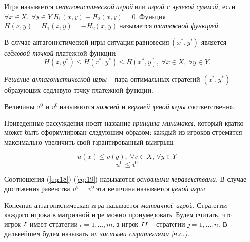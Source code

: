 \begin{definition}
	Игра называется \emph{антагонистической игрой} или \emph{игрой с нулевой суммой}, если $\forall x \in X, \ \forall y \in Y \ H_1(x,y)+H_2(x,y) = 0$. Функция $H(x,y) = H_1(x,y) = -H_2(x,y)$ называется \emph{платежной функцией}.
\end{definition}

\begin{definition}
	В случае антагонистической игры ситуация равновесия $(x^*,y^*)$ является \emph{седловой точкой} платежной функции:
	\[
		H(x,y^*) \leqslant H(x^*,y^*) \leqslant H(x^*,y), \ \forall x \in X, \ \forall y \in Y.
	\]
\end{definition}

\begin{definition}
	\emph{Решение антагонистической игры} -- пара оптимальных стратегий $(x^*,y^*)$, образующих седловую точку платежной функции.
\end{definition}

\begin{definition}
	Величины $u^0$ и $v^0$ называются \emph{нижней} и \emph{верхней ценой игры} соответственно.
\end{definition}

\begin{definition}
	Приведенные рассуждения носят название \emph{принципа минимакса}, который кратко может быть сформулирован следующим образом: каждый из игроков стремится максимально увеличить свой гарантированный выигрыш.
\end{definition}

\begin{equation}\label{eq:18}
	u(x) \leqslant v(y), \ \forall x \in X, \ \forall y \in Y
\end{equation}
\begin{equation}\label{eq:19}
	u^0 \leqslant v^0
\end{equation}

\begin{definition}
	Соотношения (\ref{eq:18})-(\ref{eq:19}) называются \emph{основными неравенствами}. В случае достижения равенства $u^0 = v^0$ эта величина называется \emph{ценой игры}.
\end{definition}

\begin{definition}
	Конечная антагонистическая игра называется \emph{матричной игрой}. Стратегии каждого игрока в матричной игре можно пронумеровать. Будем считать, что игрок $\RomanNumeralCaps{1}$ имеет стратегии $i = 1,\ldots ,m$, а игрок $\RomanNumeralCaps{2}$ -- стратегии $j=1,\ldots ,n$. В дальнейшем будем называть их \emph{чистыми стратегиями (ч.с.)}.
\end{definition}

